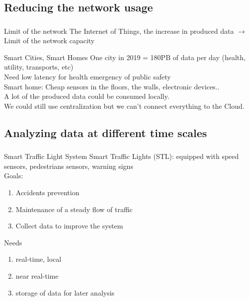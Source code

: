 \documentclass[utf8,xcolor=table, page number]{earlywinter}
\begin{document}
\subsection{Reducing the network usage}
\begin{frame}
  \frametitle{\secname}
  \framesubtitle{\subsecname}

  \begin{alertblock}{Limit of the network}
    The Internet of Things, the increase in produced data $\to$ Limit of the network capacity
  \end{alertblock}

  \begin{exampleblock}{Smart Cities, Smart Homes}
    One city in 2019 = 180PB of data per day (health, utility, transports, etc)\\
    Need low latency for health emergency of public safety \\
    Smart home: Cheap sensors in the floors, the walls, electronic devices..\\
    A lot of the produced data could be consumed locally.\\
    We could still use centralization but we can't connect everything to the Cloud.
  \end{exampleblock}
  
\end{frame}


\subsection{Analyzing data at different time scales}
\begin{frame}
  \frametitle{\secname}
  \framesubtitle{\subsecname}

  \begin{exampleblock}{Smart Traffic Light System}
    Smart Traffic Lights (STL): equipped with speed sensors, pedestrians sensors, warning signs\\
    Goals:
    \begin{enumerate}
      \item Accidents prevention
      \item Maintenance of a steady flow of traffic
      \item Collect data to improve the system
    \end{enumerate}
  \end{exampleblock}
  
  \begin{block}{Needs}
    \begin{enumerate}
      \item real-time, local
      \item near real-time
      \item storage of data for later analysis
    \end{enumerate}
  \end{block}
  
\end{frame}
\end{document}

